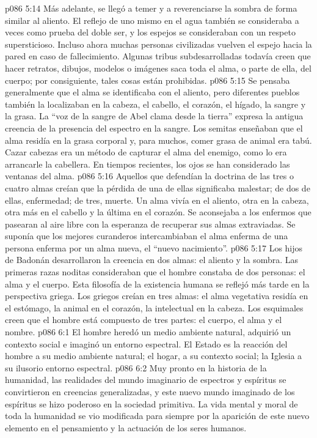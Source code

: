 \vs p086 5:14 Más adelante, se llegó a temer y a reverenciarse la sombra de forma similar al aliento. El reflejo de uno mismo en el agua también se consideraba a veces como prueba del doble ser, y los espejos se consideraban con un respeto supersticioso. Incluso ahora muchas personas civilizadas vuelven el espejo hacia la pared en caso de fallecimiento. Algunas tribus subdesarrolladas todavía creen que hacer retratos, dibujos, modelos o imágenes saca toda el alma, o parte de ella, del cuerpo; por consiguiente, tales cosas están prohibidas.
\vs p086 5:15 Se pensaba generalmente que el alma se identificaba con el aliento, pero diferentes pueblos también la localizaban en la cabeza, el cabello, el corazón, el hígado, la sangre y la grasa. La “voz de la sangre de Abel clama desde la tierra” expresa la antigua creencia de la presencia del espectro en la sangre. Los semitas enseñaban que el alma residía en la grasa corporal y, para muchos, comer grasa de animal era tabú. Cazar cabezas era un método de capturar el alma del enemigo, como lo era arrancarle la cabellera. En tiempos recientes, los ojos se han considerado las ventanas del alma.
\vs p086 5:16 Aquellos que defendían la doctrina de las tres o cuatro almas creían que la pérdida de una de ellas significaba malestar; de dos de ellas, enfermedad; de tres, muerte. Un alma vivía en el aliento, otra en la cabeza, otra más en el cabello y la última en el corazón. Se aconsejaba a los enfermos que pasearan al aire libre con la esperanza de recuperar sus almas extraviadas. Se suponía que los mejores curanderos intercambiaban el alma enferma de una persona enferma por un alma nueva, el “nuevo nacimiento”.
\vs p086 5:17 Los hijos de Badonán desarrollaron la creencia en dos almas: el aliento y la sombra. Las primeras razas noditas consideraban que el hombre constaba de dos personas: el alma y el cuerpo. Esta filosofía de la existencia humana se reflejó más tarde en la perspectiva griega. Los griegos creían en tres almas: el alma vegetativa residía en el estómago, la animal en el corazón, la intelectual en la cabeza. Los esquimales creen que el hombre está compuesto de tres partes: el cuerpo, el alma y el nombre.
\vs p086 6:1 El hombre heredó un medio ambiente natural, adquirió un contexto social e imaginó un entorno espectral. El Estado es la reacción del hombre a su medio ambiente natural; el hogar, a su contexto social; la Iglesia a su ilusorio entorno espectral.
\vs p086 6:2 Muy pronto en la historia de la humanidad, las realidades del mundo imaginario de espectros y espíritus se convirtieron en creencias generalizadas, y este nuevo mundo imaginado de los espíritus se hizo poderoso en la sociedad primitiva. La vida mental y moral de toda la humanidad se vio modificada para siempre por la aparición de este nuevo elemento en el pensamiento y la actuación de los seres humanos.
